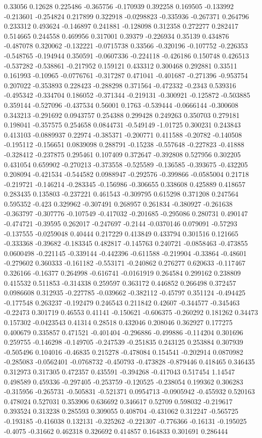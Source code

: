 0.33056 0.12628 0.225486 -0.365756 -0.170939 0.392258 0.169505 -0.133992 -0.213601 -0.254824 0.217899 0.322918 -0.0298823 -0.335936 -0.267371 0.264796 0.233312 0.493624 -0.146897 0.241881 -0.128098 0.312358 0.272277 0.282417 0.514665 0.244558 0.469956 0.317001 0.39379 -0.226934 0.35139 0.434876 -0.487078 0.320062 -0.132221 -0.0715738 0.33566 -0.320196 -0.107752 -0.226353 -0.548765 -0.194944 0.350591 -0.0607336 -0.224118 -0.426186 0.150748 0.426513 -0.537282 -0.538861 -0.217952 0.159121 0.433312 0.300468 0.292881 0.33511 0.161993 -0.10965 -0.0776761 -0.317287 0.471041 -0.401687 -0.271396 -0.953754 0.207022 -0.353893 0.228423 -0.288298 0.371564 -0.472332 -0.2343 0.539316 -0.495342 -0.334704 0.186052 -0.371344 -0.219131 -0.300921 -0.125872 -0.503885 0.359144 -0.527096 -0.437534 0.56001 0.1763 -0.539444 -0.0666144 -0.300608 0.343213 -0.291692 0.0943757 0.254388 0.299428 0.249263 0.350703 0.279181 0.198041 -0.357575 0.254658 0.0844731 -0.549149 -1.01725 0.300231 0.243843 0.413103 -0.0889937 0.22974 -0.385371 -0.200771 0.411588 -0.20782 -0.140508 -0.195112 -0.156651 0.0839098 0.288791 -0.15238 -0.557648 -0.227823 -0.41888 -0.328412 -0.237875 0.295461 0.107409 0.372647 -0.392808 0.527956 0.302205 0.431054 0.659902 -0.270213 -0.373558 -0.525589 -0.136585 -0.393675 -0.432205 0.208094 -0.421534 -0.544582 0.0988947 -0.292576 -0.399866 -0.0585004 0.21718 -0.219721 -0.146214 -0.283345 -0.156986 -0.306655 0.338608 0.425889 0.418657 0.283435 0.135803 -0.237221 0.461543 -0.309795 0.615298 0.371208 0.247564 0.595352 -0.423 0.329962 -0.307491 0.268957 0.261834 -0.380927 -0.261638 -0.363797 -0.307776 -0.107549 -0.417032 -0.201685 -0.295086 0.280731 0.490147 -0.474721 -0.39595 0.262017 -0.247697 -0.2144 -0.0370146 0.079091 -0.57293 -0.137555 -0.0259048 0.40444 0.217229 0.413849 0.433794 0.301516 0.121665 -0.333368 -0.39682 -0.183345 0.482817 -0.145763 0.240721 -0.0858463 -0.473855 0.0600498 -0.221145 -0.339144 -0.442396 -0.611588 -0.219904 -0.33864 -0.48601 -0.279602 0.360333 -0.161182 -0.553171 -0.240862 0.276277 0.620633 -0.117467 0.326166 -0.16377 0.264998 -0.616741 -0.0161919 0.264584 0.299162 0.238809 0.415532 0.511853 -0.314338 0.259597 0.363172 0.446852 0.266498 0.372457 0.0986608 0.312935 -0.227785 -0.039662 -0.382112 -0.45797 0.351124 -0.494425 -0.177548 0.263237 -0.192479 0.246543 0.211842 0.42607 -0.344577 -0.345463 -0.22473 0.301719 0.46553 0.41141 -0.150621 -0.606375 -0.260292 0.181262 0.34473 0.157302 -0.0423543 0.41314 0.28518 0.432046 0.208046 0.362927 0.177275 0.400679 0.335857 0.471521 -0.401404 -0.296886 -0.499886 -0.114204 0.301696 0.259755 -0.146298 -0.149705 -0.247539 -0.251835 0.243125 0.253884 0.307939 -0.505496 0.104016 -0.46835 0.215278 -0.478084 0.154541 -0.202914 0.0870982 -0.285083 -0.0562401 -0.0768732 -0.450793 -0.473828 -0.879446 0.418465 0.346435 0.312973 0.317305 0.472357 0.435591 -0.394268 -0.417043 0.517454 1.14547 0.498589 0.459336 -0.297405 -0.253759 -0.120525 -0.238054 0.199362 0.306283 -0.315956 -0.265731 -0.505831 -0.521371 0.0954713 -0.0905942 -0.455932 0.520163 0.478024 0.527031 0.353906 0.636692 0.346617 0.52709 0.598032 -0.219617 0.393524 0.313238 0.285593 0.309055 0.408704 -0.431062 0.312247 -0.565725 -0.193185 -0.416038 0.132131 -0.325262 -0.221307 -0.776366 -0.16131 -0.195025 -0.4075 -0.31662 0.462318 0.326692 0.414857 0.164833 0.301691 0.286444 